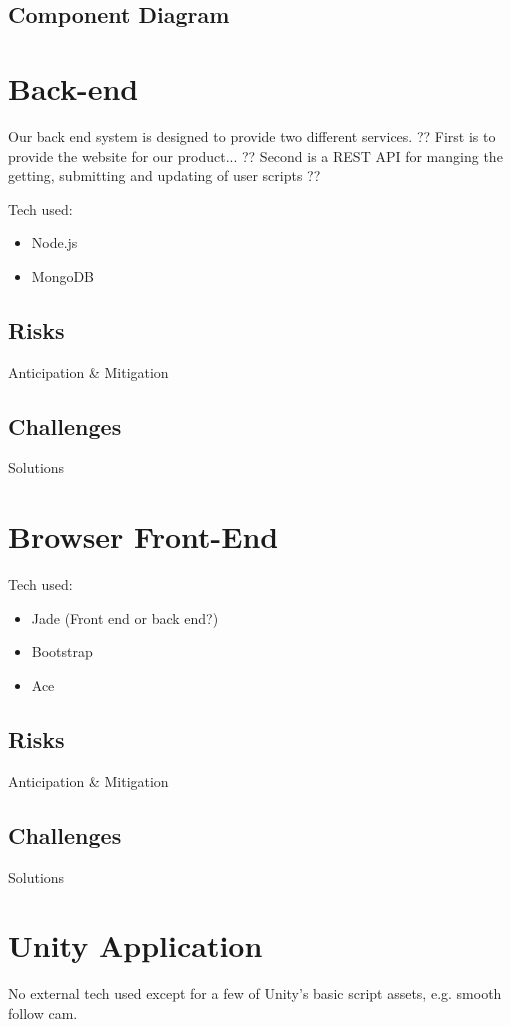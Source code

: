 \subsection{Component Diagram}



\section{Back-end}

Our back end system is designed to provide two different services. ??
First is to provide the website for our product... ??
Second is a REST API for manging the getting, submitting and updating of user scripts ?? 

Tech used:
\begin{itemize}
\item Node.js
\item MongoDB
\end{itemize}

\subsection{Risks}
Anticipation \& Mitigation

\subsection{Challenges}
Solutions

\section{Browser Front-End}
Tech used:
\begin{itemize}
\item Jade (Front end or back end?)
\item Bootstrap
\item Ace
\end{itemize}
\subsection{Risks}
Anticipation \& Mitigation

\subsection{Challenges}
Solutions


\section{Unity Application}
No external tech used except for a few of Unity's basic script assets, e.g. smooth follow cam.

